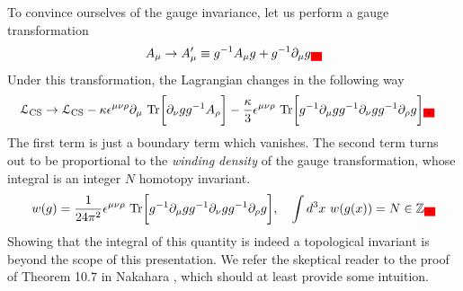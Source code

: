     To convince ourselves of the gauge invariance, let us perform a gauge transformation
    \begin{align}
        A_{\mu} \rightarrow A'_{\mu} \equiv g^{-1} A_{\mu} g + g^{-1}\partial_{\mu} g\colorbox{red}{.}
    \end{align}
    Under this transformation, the Lagrangian changes in the following way
    \begin{align}
        \mathcal{L}_{\text{CS}} &\rightarrow \mathcal{L}_{\text{CS}}  - \kappa \epsilon^{\mu \nu \rho} \partial_{\mu} \ \mathrm{Tr} \bigg[\partial_{\nu} g g^{-1} A_{\rho}  \bigg] - \frac{\kappa}{3} \epsilon^{\mu \nu \rho} \ \mathrm{Tr} \bigg[g^{-1} \partial_{\mu} g g^{-1} \partial_{\nu} g g^{-1} \partial_{\rho} g\bigg]\colorbox{red}{.}
    \end{align}
    The first term is just a boundary term which vanishes. The second term turns out to be proportional to the \textit{winding density} of the gauge transformation, whose integral is an integer $N$ homotopy invariant.
    \begin{align}
        w(g) = \frac{1}{24 \pi^2} \epsilon^{\mu \nu \rho} \ \mathrm{Tr} \bigg[g^{-1}\partial_{\mu} g g^{-1} \partial_{\nu} g g^{-1} \partial_{\rho} g \bigg], \quad \int d^3x \ w(g(x)) = N \in \mathbb{Z}\colorbox{red}{.}
    \end{align}
    Showing that the integral of this quantity is indeed a topological invariant is beyond the scope of this presentation. We refer the skeptical reader to the proof of Theorem 10.7 in Nakahara \cite{Nakahara}, which should at least provide some intuition.


